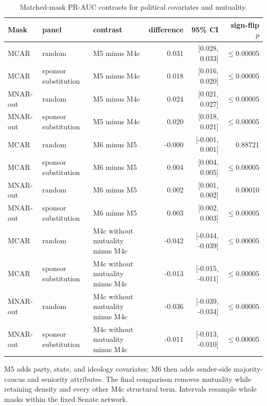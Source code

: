 \begin{table}[tbp]
\centering
\small
\caption{Matched-mask PR-AUC contrasts for political covariates and mutuality.}
\label{tab:political-contrast}
\begin{tabular}{lllrrr}
\toprule
Mask & panel & contrast & difference & 95\% CI & sign-flip $p$ \\
\midrule
MCAR & random & M5 minus M4c & 0.031 & [0.028, 0.033] & $\leq0.00005$ \\
MCAR & sponsor substitution & M5 minus M4c & 0.018 & [0.016, 0.020] & $\leq0.00005$ \\
MNAR-out & random & M5 minus M4c & 0.024 & [0.021, 0.027] & $\leq0.00005$ \\
MNAR-out & sponsor substitution & M5 minus M4c & 0.020 & [0.018, 0.021] & $\leq0.00005$ \\
MCAR & random & M6 minus M5 & -0.000 & [-0.001, 0.001] & 0.88721 \\
MCAR & sponsor substitution & M6 minus M5 & 0.004 & [0.004, 0.005] & $\leq0.00005$ \\
MNAR-out & random & M6 minus M5 & 0.002 & [0.001, 0.002] & 0.00010 \\
MNAR-out & sponsor substitution & M6 minus M5 & 0.003 & [0.002, 0.003] & $\leq0.00005$ \\
MCAR & random & M4c without mutuality minus M4c & -0.042 & [-0.044, -0.039] & $\leq0.00005$ \\
MCAR & sponsor substitution & M4c without mutuality minus M4c & -0.013 & [-0.015, -0.011] & $\leq0.00005$ \\
MNAR-out & random & M4c without mutuality minus M4c & -0.036 & [-0.039, -0.034] & $\leq0.00005$ \\
MNAR-out & sponsor substitution & M4c without mutuality minus M4c & -0.011 & [-0.013, -0.010] & $\leq0.00005$ \\
\bottomrule
\end{tabular}
\par\vspace{2pt}\footnotesize M5 adds party, state, and ideology covariates; M6 then adds sender-side majority-caucus and seniority attributes. The final comparison removes mutuality while retaining density and every other M4c structural term. Intervals resample whole masks within the fixed Senate network.
\end{table}
